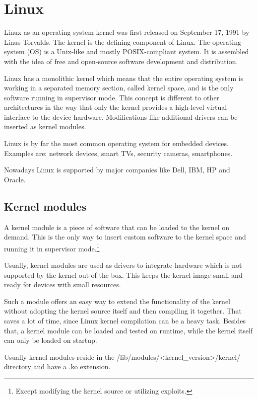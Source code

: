 \section{Linux}

Linux as an operating system kernel was first released on September 17, 1991 by Linus Torvalds.\cite{linux} The kernel is the defining component of Linux. The operating system (OS) is a Unix-like and mostly POSIX-compliant system. It is assembled with the idea of free and open-source software development and distribution.

Linux has a monolithic kernel which means that the entire operating system is working in a separated memory section, called kernel space, and is the only software running in supervisor mode. This concept is different to other architectures in the way that only the kernel provides a high-level virtual interface to the device hardware. Modifications like additional drivers can be inserted as kernel modules.

Linux is by far the most common operating system for embedded devices. Examples are: network devices, smart TVs, security cameras, smartphones.

Nowadays Linux is supported by major companies like Dell, IBM, HP and Oracle.

\subsection{Kernel modules}

A kernel module is a piece of software that can be loaded to the kernel on demand.\cite{kernel_modules} This is the only way to insert custom software to the kernel space and running it in supervisor mode.\footnote{Except modifying the kernel source or utilizing exploits.}

Usually, kernel modules are used as drivers to integrate hardware which is not supported by the kernel out of the box. This keeps the kernel image small and ready for devices with small resources.

Such a module offers an easy way to extend the functionality of the kernel without adopting the kernel source itself and then compiling it together. That saves a lot of time, since Linux kernel compilation can be a heavy task. Besides that, a kernel module can be loaded and tested on runtime, while the kernel itself can only be loaded on startup.

Usually kernel modules reside in the /lib/modules/<kernel\_version>/kernel/ directory and have a .ko extension.

